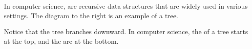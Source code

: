 In computer science,  are recursive data structures that are widely
used in various settings. The diagram to the right is an example of a tree.

Notice that the tree branches downward. In computer science, the
 of a tree starts at the top, and the  are at the
bottom.

